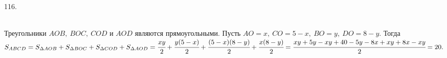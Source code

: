 116. \begin{figure}[ht!]
\end{figure}\\
Треугольники $AOB,\ BOC,\ COD$ и $AOD$ являются прямоугольными. Пусть $AO=x,\ CO=5-x,\ BO=y,\ DO=8-y.$ Тогда $S_{ABCD}=S_{\Delta AOB}+S_{\Delta BOC}+S_{\Delta COD}+S_{\Delta AOD}=\cfrac{xy}{2}+\cfrac{y(5-x)}{2}+\cfrac{(5-x)(8-y)}{2}+\cfrac{x(8-y)}{2}=\cfrac{xy+5y-xy+40-5y-8x+xy+8x-xy}{2}=20.$\newpage\noindent
